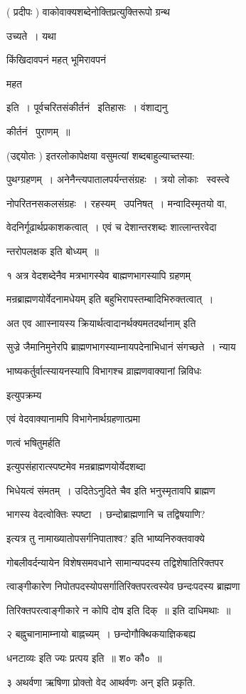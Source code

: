\documentclass[11pt, openany]{book}
\begin{document}
( प्रदीपः ) वाकोवाक्यशब्देनोक्तिप्रत्युक्तिरूपो ग्रन्थ 

उच्यते~। यथा \textendash\ {\qt किंखिदावपनं महत् भूमिरावपनं 

महत} इति~। पूर्वचरितसंकीर्तनं \textendash\ इतिहासः~। वंशाद्यनु \textendash\ 

कीर्तनं \textendash\ पुराणम्~॥ 

(उद्दयोतः ) इतरलोकापेक्षया वसुमत्यां शब्दबाहुल्याच्तस्या: 

पुथग्ग्रहणम्~। अनेनैन्त्यपातालपर्यन्तसंग्रहः~। त्रयो लोकाः \textendash\ स्वस्त्वे \textendash\ 

नोपरितनसकलसंग्रहः~। रहस्यम् \textendash\ उपनिषत्~। मन्वादिस्मृतयो वा, 

वेदनिर्गूढार्थप्रकाशकत्वात्~। एवं च देशान्तरशब्दः शात्लान्तरवेदा \textendash\ 

न्तरोपलक्षक इति बोध्यम्~॥ 

१ अत्र वेदशब्देनैव मत्रभागस्येव बाह्मणभागस्यापि ग्रहणम् 

{\qt मन्रब्राह्मणयोर्वेदनामधेयम्} इति बहुभिरापस्तम्बादिभिरुक्तत्वात्~। 

अत एव {\qt आास्नायस्य क्रियार्थत्वादानर्थक्यमतदर्थानाम्} इति 

सुज्रे जैमानिमुनेरपि ब्राह्मणभागस्याम्नायपदेनाभिधानं संगच्छते~। न्याय \textendash\ 


भाष्यकर्तुर्वात्स्यायनस्यापि विभागश्च व्राह्मणवाक्यानां न्निविधः 

इत्युपक्रम्य \textendash\ {\qt एवं वेदवाक्यानामपि विभागेनार्थग्रहणात्प्रमा \textendash\ 

णत्वं भषितुमर्हति} इत्युपसंहारात्स्पष्टमेव मन्रब्राह्मणयोर्येदशब्दा \textendash\ 

भिधेयत्वं संमतम्~। {\qt उदितेऽनुदिते चैव} इति भनुस्मृतावपि ब्राह्मण \textendash\ 

भागस्य वेदत्वोक्तिः स्पष्टा~। छन्दोब्राह्मणानि च तद्विषयाणि? 

इत्यत्र तु {\qt नामाख्यातोपसर्गनिपाताश्व}? इति भाष्यनिरुक्तवाक्ये 

गोबलीवर्दन्यायेन विशेषसमवधाने सामान्यपदस्य तद्विशेषातिरिक्तपर \textendash\ 

त्वाङ्गीकारेण निपोतपदस्योपसर्गातिरिक्तपरत्वस्येव छन्दःपदस्य ब्राह्मणा \textendash\ 


तिरिक्तपरत्वाङ्गीकारे न कोपि दोष इति दिक्~॥ इति दाधिमथाः~॥ 

२ बह्नुचानामाम्नायो बाह्नच्यम्~। छन्दोगौक्थिकयाज्ञिकबह्य \textendash\ 

धनटाव्यः इति ज्यः प्रत्पय इति~॥ श० कौ०~॥ 

३ अथर्वणा ऋषिणा प्रोक्तो वेद आथर्वणः {\qt अन्} इति प्रकृति. 
\end{document}
